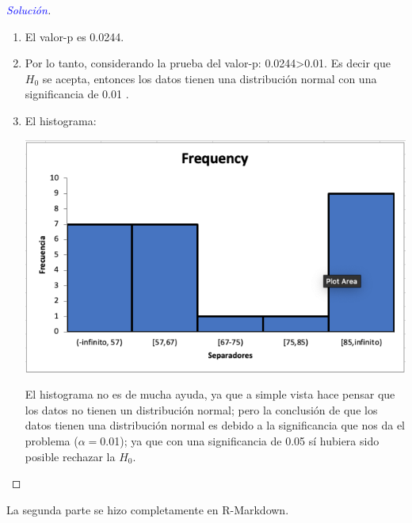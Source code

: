 \documentclass[a4paper,12pt]{article}
\newenvironment{solution}
  {\renewcommand\qedsymbol{$\square$}\begin{proof}[\textcolor{blue}{Solución}]}
  {\end{proof}}
\begin{document}
\begin{solution}
\begin{enumerate}
    \item El valor-p es 0.0244. 
    \item Por lo tanto, considerando la prueba del valor-p: 0.0244>0.01. Es decir que $H_0$ se acepta, entonces los datos tienen una distribución normal con una significancia de 0.01 . 
    \item El histograma: 
    \begin{center}
    \includegraphics[scale=0.4]{images/Screen Shot 2021-05-11 at 15.19.10.png}
\end{center}
 El histograma no es de mucha ayuda, ya que a simple vista hace pensar que los datos no tienen un distribución normal; pero la conclusión de que los datos tienen una distribución normal es debido a la significancia que nos da el problema ($\alpha=$0.01); ya que con una significancia de 0.05 sí hubiera sido posible rechazar la $H_0$.
\end{enumerate}

\end{solution}

\begin{tcolorbox}[colback=gray!15,colframe=black!1!black,title=Segunda parte]
La segunda parte se hizo completamente en R-Markdown.
\end{tcolorbox}

\newpage 




%
%
\end{document}
